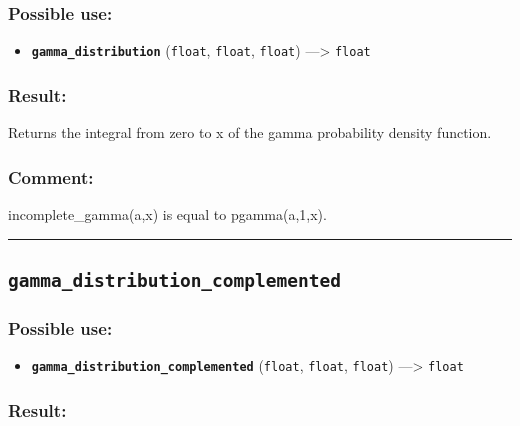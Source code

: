 \documentclass[]{book}
\providecommand{\tightlist}{%
  \setlength{\itemsep}{0pt}\setlength{\parskip}{0pt}}
\theoremstyle{definition}
\theoremstyle{definition}
\theoremstyle{definition}
\theoremstyle{remark}
\begin{document}
\subsubsection{Possible use:}\label{possible-use-181}

\begin{itemize}
\tightlist
\item
  \textbf{\texttt{gamma\_distribution}} (\texttt{float}, \texttt{float},
  \texttt{float}) ---\textgreater{} \texttt{float}
\end{itemize}

\subsubsection{Result:}\label{result-175}

Returns the integral from zero to x of the gamma probability density
function.

\subsubsection{Comment:}\label{comment-39}

incomplete\_gamma(a,x) is equal to pgamma(a,1,x).

\begin{center}\rule{0.5\linewidth}{\linethickness}\end{center}

\subsection{\texorpdfstring{\texttt{gamma\_distribution\_complemented}}{gamma\_distribution\_complemented}}\label{gamma_distribution_complemented}

\subsubsection{Possible use:}\label{possible-use-182}

\begin{itemize}
\tightlist
\item
  \textbf{\texttt{gamma\_distribution\_complemented}} (\texttt{float},
  \texttt{float}, \texttt{float}) ---\textgreater{} \texttt{float}
\end{itemize}

\subsubsection{Result:}\label{result-176}
\end{document}
